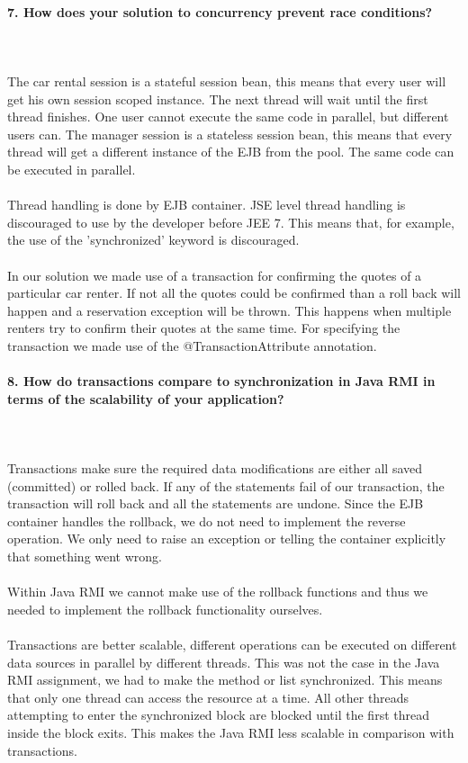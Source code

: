 \documentclass{ds-report}
\begin{document}
	\paragraph{7. How does your solution to concurrency prevent race conditions?} \mbox{}\\\\
The car rental session is a stateful session bean, this means that every user will get his own session scoped instance. The next thread will wait until the first thread finishes. One user cannot execute the same code in parallel, but different users can.
The manager session is a stateless session bean, this means that every thread will get a different instance of the EJB from the pool. The same code can be executed in parallel.\\\\\clearpage
Thread handling is done by EJB container. JSE level thread handling is discouraged to use by the developer before JEE 7. This means that, for example, the use of the 'synchronized' keyword is discouraged.\\\\
In our solution we made use of a transaction for confirming the quotes of a particular car renter. If not all the quotes could be confirmed than a roll back will happen and a reservation exception will be thrown. This happens when multiple renters try to confirm their quotes at the same time. For specifying the transaction we made use of the @TransactionAttribute annotation.



	\paragraph{8. How do transactions compare to synchronization in Java RMI in terms of the scalability of your application?} \mbox{}\\\\
Transactions make sure the required data modifications are either all saved (committed) or rolled back. If any of the statements fail of our transaction, the transaction will roll back and all the statements are undone. Since the EJB container handles the rollback, we do not need to implement the reverse operation. We only need to raise an exception or telling the container explicitly that something went wrong.\\\\
Within Java RMI we cannot make use of the rollback functions and thus we needed to implement the rollback functionality ourselves.\\\\
Transactions are better scalable, different operations can be executed on different data sources in parallel by different threads. This was not the case in the Java RMI assignment, we had to make the method or list synchronized. This means that only one thread can access the resource at a time. All other threads attempting to enter the synchronized block are blocked until the first thread inside the block exits. This makes the Java RMI less scalable in comparison with transactions.
\end{document}
